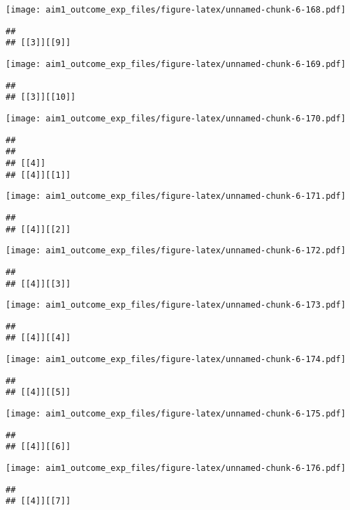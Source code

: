 \documentclass[
]{article}
\begin{document}
\texttt{[image: aim1\_outcome\_exp\_files/figure-latex/unnamed-chunk-6-168.pdf]}

\begin{verbatim}
## 
## [[3]][[9]]
\end{verbatim}

\texttt{[image: aim1\_outcome\_exp\_files/figure-latex/unnamed-chunk-6-169.pdf]}

\begin{verbatim}
## 
## [[3]][[10]]
\end{verbatim}

\texttt{[image: aim1\_outcome\_exp\_files/figure-latex/unnamed-chunk-6-170.pdf]}

\begin{verbatim}
## 
## 
## [[4]]
## [[4]][[1]]
\end{verbatim}

\texttt{[image: aim1\_outcome\_exp\_files/figure-latex/unnamed-chunk-6-171.pdf]}

\begin{verbatim}
## 
## [[4]][[2]]
\end{verbatim}

\texttt{[image: aim1\_outcome\_exp\_files/figure-latex/unnamed-chunk-6-172.pdf]}

\begin{verbatim}
## 
## [[4]][[3]]
\end{verbatim}

\texttt{[image: aim1\_outcome\_exp\_files/figure-latex/unnamed-chunk-6-173.pdf]}

\begin{verbatim}
## 
## [[4]][[4]]
\end{verbatim}

\texttt{[image: aim1\_outcome\_exp\_files/figure-latex/unnamed-chunk-6-174.pdf]}

\begin{verbatim}
## 
## [[4]][[5]]
\end{verbatim}

\texttt{[image: aim1\_outcome\_exp\_files/figure-latex/unnamed-chunk-6-175.pdf]}

\begin{verbatim}
## 
## [[4]][[6]]
\end{verbatim}

\texttt{[image: aim1\_outcome\_exp\_files/figure-latex/unnamed-chunk-6-176.pdf]}

\begin{verbatim}
## 
## [[4]][[7]]
\end{verbatim}
\end{document}
